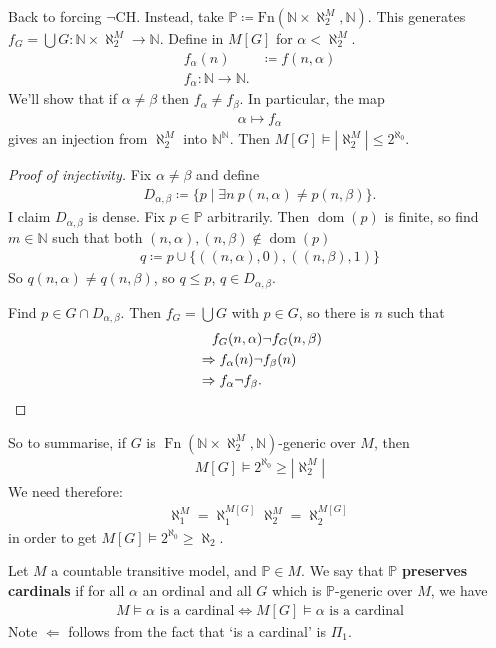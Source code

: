 \documentclass{article}
\newcommand{\named}[1]{\textbf{#1}\index{#1}}
\newcommand{\p}{\mathbb{P}}
\newcommand{\1}{\mathbbm{1}}
\DeclareMathOperator{\dom}{dom}
\let\models\vDash
\begin{document}
Back to forcing $\neg$\textsf{CH}.
Instead, take $\p \coloneqq \text{Fn}(\mathbb{N} \times \aleph_2^M, \mathbb{N})$.
This generates $f_G = \bigcup G: \mathbb{N} \times \aleph_2^M \to \mathbb{N}$.
Define in $M[G]$ for $\alpha < \aleph_2^M$.
\begin{align*}
  f_\alpha(n) &\coloneqq f(n,\alpha) \\
  f_\alpha: \mathbb{N} \to \mathbb{N}.
\end{align*}
We'll show that if $\alpha \neq \beta$ then $f_\alpha \neq f_\beta$.
In particular, the map
\begin{align*}
  \alpha \mapsto f_\alpha
\end{align*}
gives an injection from $\aleph_2^M$ into $\mathbb{N}^\mathbb{N}$.
Then $M[G] \models |\aleph_2^M| \leq 2^{\aleph_0}$.

\begin{proof}[Proof of injectivity]
  Fix $\alpha \neq \beta$ and define
  \begin{align*}
    D_{\alpha,\beta} \coloneqq \{p \mid \exists n \ p(n,\alpha) \neq p(n,\beta)\}.
  \end{align*}
  I claim $D_{\alpha,\beta}$ is dense. Fix $p \in \p$ arbitrarily. Then $\dom(p)$ is finite, so find $m \in \mathbb{N}$ such that both $(n,\alpha), (n,\beta) \notin \dom(p)$
  \begin{align*}
    q \coloneqq p \cup \{((n,\alpha), 0), ((n,\beta),1)\}
  \end{align*}
  So $q(n,\alpha) \neq q(n,\beta)$, so $q \leq p$, $q \in D_{\alpha,\beta}$.

  Find $p \in G \cap D_{\alpha,\beta}$. Then $f_G = \bigcup G$ with $p \in G$, so there is $n$ such that
  \begin{align*}
    &\phantom{\Rightarrow} f_G(n,\alpha) \neg f_G(n,\beta) \\
    &\Rightarrow f_\alpha(n) \neg f_\beta(n) \\
    &\Rightarrow f_\alpha \neg f_\beta. \qedhere
  \end{align*}
\end{proof}
So to summarise, if $G$ is $\operatorname{Fn}(\mathbb{N} \times \aleph_2^M, \mathbb{N})$-generic over $M$, then
\begin{align*}
  M[G] \models 2^{\aleph_0} \geq |\aleph_2^M|
\end{align*}
We need therefore:
\begin{align*}
  \aleph_1^M = \aleph_1^{M[G]}
  \aleph_2^M = \aleph_2^{M[G]}
\end{align*}
in order to get $M[G] \models 2^{\aleph_0} \geq \aleph_2$.
\begin{defi}
  Let $M$ a countable transitive model, and $\p \in M$.
  We say that $\p$ \named{preserves cardinals} if for all $\alpha$ an ordinal and all $G$ which is $\p$-generic over $M$, we have
  \begin{align*}
    M \models \alpha \text{ is a cardinal} \iff M[G] \models \alpha \text{ is a cardinal}
  \end{align*}
  Note $\Leftarrow$ follows from the fact that `is a cardinal' is $\Pi_1$.
\end{defi}
\end{document}

